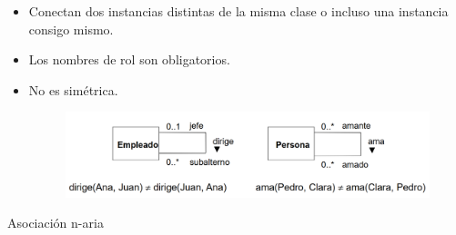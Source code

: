 \documentclass[12pt, twoside, openright]{report} %
\begin{document}
    \begin{itemize}
    
    \item
      Conectan dos instancias distintas de la misma clase o incluso una
      instancia consigo mismo.
    \item
      Los nombres de rol son obligatorios.
    \item
      No es simétrica.
	  \begin{figure}[H]
		{\includegraphics[scale=.26]{Untitled 21.png}}
	\end{figure}
    \end{itemize}
\pagebreak
	Asociación n-aria
\end{document}
